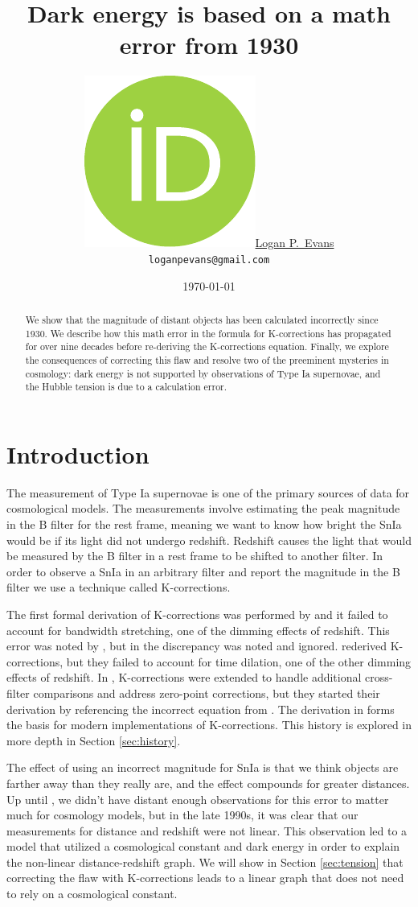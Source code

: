 \documentclass{article}
\title{Dark energy is based on a math error from 1930}
\date{\today}
\author{
  \href{https://orcid.org/0000-0001-6450-3262}{\includegraphics[scale=0.06]{orcid.pdf}\hspace{1mm}Logan P.~Evans}
  \\ \texttt{loganpevans@gmail.com}
}
\begin{document}
\maketitle

\begin{abstract}
  We show that the magnitude of distant objects has been calculated incorrectly
  since 1930. We describe how this math error in the formula for K-corrections
  has propagated for over nine decades before re-deriving the K-corrections
  equation. Finally, we explore the consequences of correcting this flaw and
  resolve two of the preeminent mysteries in cosmology: dark energy is not
  supported by observations of Type Ia supernovae, and the Hubble tension is
  due to a calculation error.
\end{abstract}

\section{Introduction}

The measurement of Type Ia supernovae is one of the primary sources of data for
cosmological models. The measurements involve estimating the peak magnitude in
the B filter \citet{riess1998} for the rest frame, meaning we want to know how
bright the SnIa would be if its light did not undergo redshift. Redshift causes
the light that would be measured by the B filter in a rest frame to be shifted
to another filter. In order to observe a SnIa in an arbitrary filter and report
the magnitude in the B filter we use a technique called K-corrections.

The first formal derivation of K-corrections was performed by
\citet{tolman1930} and it failed to account for bandwidth stretching, one of
the dimming effects of redshift. This error was noted by \citet{desitter1934},
but in \citet{hubble1935} the discrepancy was noted and ignored.
\citet{oke1968} rederived K-corrections, but they failed to account for time
dilation, one of the other dimming effects of redshift. In \citet{kim1996},
K-corrections were extended to handle additional cross-filter comparisons and
address zero-point corrections, but they started their derivation by
referencing the incorrect equation from \citet{oke1968}. The derivation in
\citet{kim1996} forms the basis for modern implementations of K-corrections.
This history is explored in more depth in Section \ref{sec:history}.

The effect of using an incorrect magnitude for SnIa is that we think objects
are farther away than they really are, and the effect compounds for greater
distances. Up until \citet{riess1998}, we didn't have distant enough
observations for this error to matter much for cosmology models, but in the
late 1990s, it was clear that our measurements for distance and redshift were
not linear. This observation led to a model that utilized a cosmological
constant and dark energy in order to explain the non-linear distance-redshift
graph. We will show in Section \ref{sec:tension} that correcting the flaw
with K-corrections leads to a linear graph that does not need to rely on a
cosmological constant.
\end{document}
